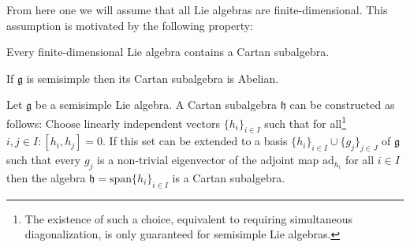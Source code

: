 	From here one we will assume that all Lie algebras are finite-dimensional. This assumption is motivated by the following property:
        \begin{property}
        	Every finite-dimensional Lie algebra contains a Cartan subalgebra.
        \end{property}
        \begin{property}
	       	If $\mathfrak{g}$ is semisimple then its Cartan subalgebra is Abelian.
        \end{property}

        \begin{construct}
        	Let $\mathfrak{g}$ be a semisimple Lie algebra. A Cartan subalgebra $\mathfrak{h}$ can be constructed as follows: Choose linearly independent vectors $\{h_i\}_{i\in I}$ such that for all\footnote{The existence of such a choice, equivalent to requiring simultaneous diagonalization, is only guaranteed for semisimple Lie algebras.} $i, j\in I: [h_i, h_j] = 0$. If this set can be extended to a basis $\{h_i\}_{i\in I}\cup\{g_j\}_{j\in J}$ of $\mathfrak{g}$ such that every $g_j$ is a non-trivial eigenvector of the adjoint map $\text{ad}_{h_i}$ for all $i\in I$ then the algebra $\mathfrak{h} = \text{span}\{h_i\}_{i\in I}$ is a Cartan subalgebra.
        \end{construct}

        
